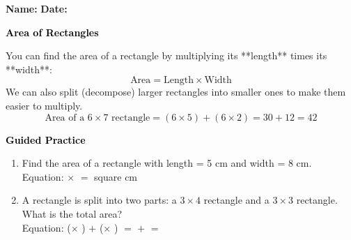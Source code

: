 \documentclass[12pt, letterpaper, fleqn]{article}
\newcommand{\blank}{\underline{\hspace{2.2cm}}}
\begin{document}
\textbf{Name:} \underline{\hspace{5cm}}
\hfill
\textbf{Date:} \underline{\hspace{3cm}}\\

\begin{tcolorbox}[colback=customteal!20]
    \large\textcolor{black}{\textbf{Area of Rectangles}}
\end{tcolorbox}

\vspace{3mm}
\noindent
You can find the area of a rectangle by multiplying its **length** times its **width**:
\[
\text{Area} = \text{Length} \times \text{Width}
\]
We can also split (decompose) larger rectangles into smaller ones to make them easier to multiply.
\[
\text{Area of a } 6 \times 7 \text{ rectangle} = (6 \times 5) + (6 \times 2) = 30 + 12 = 42
\]

\newpage
\begin{tcolorbox}[colback=customteal!20]
    \large\textcolor{black}{\textbf{Guided Practice}}
\end{tcolorbox}

\vspace{5mm}
\begin{enumerate}[itemsep=3cm, leftmargin=0.6cm]
\item Find the area of a rectangle with length = 5 cm and width = 8 cm.
\\
Equation: \blank $\times$ \blank $=$ \blank square cm

\item A rectangle is split into two parts: a $3 \times 4$ rectangle and a $3 \times 3$ rectangle. What is the total area?
\\
Equation: (\blank $\times$ \blank) $+$ (\blank $\times$ \blank) $=$ \blank $+$ \blank $=$ \blank
\end{enumerate}
\end{document}
